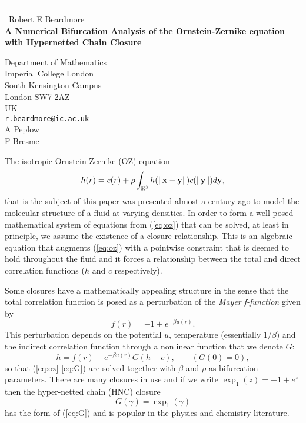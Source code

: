 \documentclass{report}
\begin{document}
\begin{center}
\rule{6in}{1pt} \
{\large Robert E Beardmore \\
{\bf A Numerical Bifurcation Analysis of the Ornstein-Zernike equation with Hypernetted Chain Closure}}

Department of Mathematics \\ Imperial College London \\ South Kensington Campus \\ London SW7 2AZ \\ UK
\\
{\tt r.beardmore@ic.ac.uk}\\
A Peplow\\
F Bresme\end{center}

The isotropic Ornstein-Zernike (OZ) equation
\begin{equation}
\label{eq:oz} h(r) = c(r) + \rho \int_{\mathbb{R}^{3}} h(\|{\bf x}-{\bf
y}\|)c(\|{\bf y}\|)d{\bf y},
\end{equation}
that is the subject of this paper was presented almost a century ago to
model the molecular
structure of a fluid at varying densities.
In order to form a well-posed mathematical system of equations from
(\ref{eq:oz}) that can be solved, at least in principle, we assume the
existence of a closure relationship. This is an algebraic equation that
augments (\ref{eq:oz}) with a pointwise constraint that is deemed to hold
throughout the fluid and it forces a relationship between the total and
direct correlation functions ($h$ and $c$ respectively).

Some closures have a mathematically appealing structure in the sense that
the total correlation function is posed as a perturbation of the {\em
Mayer f-function} given by
\[ f(r)=-1+e^{-\beta u(r)}.\]
This perturbation depends on the potential $u$, temperature (essentially
$1/\beta$) and the
indirect correlation function through a nonlinear function that we denote
$G$: \begin{equation} h = f(r) + e^{-\beta u(r)}G(h-c),\qquad
(G(0)= 0), \label{eq:G} \end{equation} so that (\ref{eq:oz}-\ref{eq:G})
are solved together with $\beta$ and $\rho$ as bifurcation parameters.
There are many closures in use and if we
write $\exp_1(z) = -1+e^z$ then the hyper-netted chain (HNC) closure
\begin{equation} G(\gamma) = \exp_1(\gamma) \end{equation} has the form
of
(\ref{eq:G}) and is popular in the physics and chemistry literature.
\end{document}
